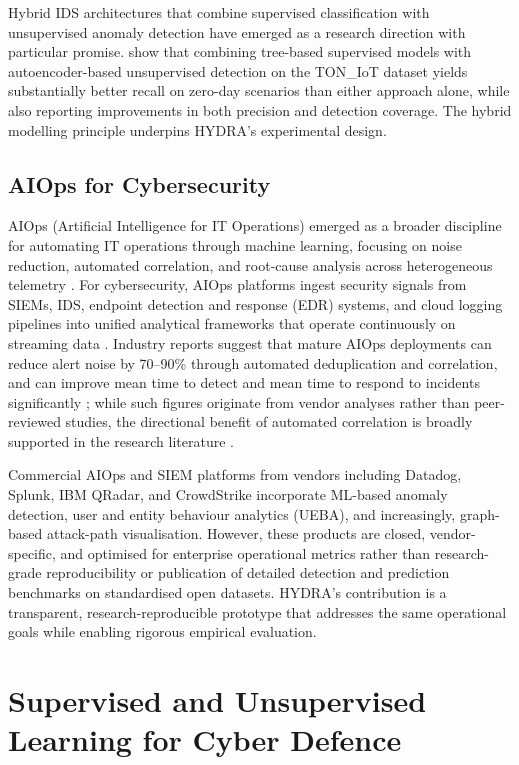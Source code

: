 \documentclass[12pt,a4paper]{report}
\begin{document}
Hybrid IDS architectures that combine supervised classification with unsupervised anomaly detection have emerged as a research direction with particular promise. \citet{alsaedi2020} show that combining tree-based supervised models with autoencoder-based unsupervised detection on the TON\_IoT dataset yields substantially better recall on zero-day scenarios than either approach alone, while also reporting improvements in both precision and detection coverage. The hybrid modelling principle underpins HYDRA's experimental design.

\subsection{AIOps for Cybersecurity}
\label{sec:aiops}

AIOps (Artificial Intelligence for IT Operations) emerged as a broader discipline for automating IT operations through machine learning, focusing on noise reduction, automated correlation, and root-cause analysis across heterogeneous telemetry \citep{dang2023}. For cybersecurity, AIOps platforms ingest security signals from SIEMs, IDS, endpoint detection and response (EDR) systems, and cloud logging pipelines into unified analytical frameworks that operate continuously on streaming data \citep{dang2023}. Industry reports suggest that mature AIOps deployments can reduce alert noise by 70--90\% through automated deduplication and correlation, and can improve mean time to detect and mean time to respond to incidents significantly \citep{dang2023,fortinet2025}; while such figures originate from vendor analyses rather than peer-reviewed studies, the directional benefit of automated correlation is broadly supported in the research literature \citep{dang2023,zhu2023}.

Commercial AIOps and SIEM platforms from vendors including Datadog, Splunk, IBM QRadar, and CrowdStrike incorporate ML-based anomaly detection, user and entity behaviour analytics (UEBA), and increasingly, graph-based attack-path visualisation. However, these products are closed, vendor-specific, and optimised for enterprise operational metrics rather than research-grade reproducibility or publication of detailed detection and prediction benchmarks on standardised open datasets. HYDRA's contribution is a transparent, research-reproducible prototype that addresses the same operational goals while enabling rigorous empirical evaluation.

\section{Supervised and Unsupervised Learning for Cyber Defence}
\label{sec:supervised}
\end{document}
